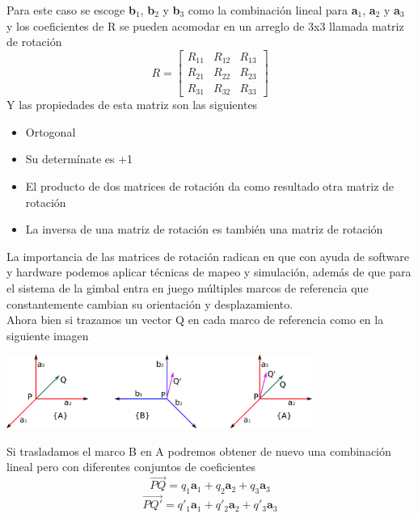 Para este caso se escoge \textbf{b}$_1$, \textbf{b}$_2$ y \textbf{b}$_3$ como la combinación
lineal para \textbf{a}$_1$, \textbf{a}$_2$ y \textbf{a}$_3$ y los coeficientes de R se
pueden acomodar en un arreglo de 3x3 llamada matriz de rotación
\begin{equation}
	R=
	\begin{bmatrix}
		R_{11} & R_{12} & R_{13} \\
		R_{21} & R_{22} & R_{23} \\
		R_{31} & R_{32} & R_{33}
	\end{bmatrix}
\end{equation}
Y las propiedades de esta matriz son las siguientes
\begin{itemize}
	\item Ortogonal
	\item Su determínate es +1
	\item El producto de dos matrices de rotación da como resultado otra matriz de rotación
	\item La inversa de una matriz de rotación es también una matriz de rotación
\end{itemize}
La importancia de las matrices de rotación radican en que con ayuda de software y hardware
podemos aplicar técnicas de mapeo y simulación, además de que para el sistema de la gimbal
entra en juego múltiples marcos de referencia que constantemente cambian su orientación y
desplazamiento.\\
Ahora bien si trazamos un vector Q en cada marco de referencia como en la siguiente imagen
\begin{center}
	\includegraphics[width=0.75\textwidth]{Contenido/Cuerpo/Capitulo3/Fig12.eps}
	\label{fig:ModeloMat:Fig1}
\end{center}
Si trasladamos el marco B en A podremos obtener de nuevo una combinación lineal pero con
diferentes conjuntos de coeficientes
\begin{equation}
	\overrightarrow{PQ} = q_1\textbf{a}_1 + q_2\textbf{a}_2 + q_3\textbf{a}_3
\end{equation}
\begin{equation}
	\overrightarrow{PQ'} = q'_1\textbf{a}_1 + q'_2\textbf{a}_2 + q'_3\textbf{a}_3
\end{equation}
